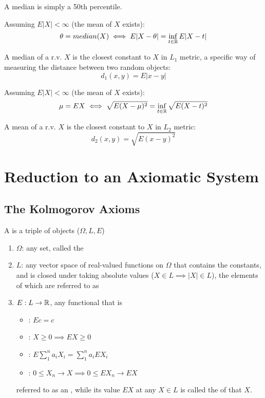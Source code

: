 \documentclass[11pt]{article}
\numberwithin{equation}{section}
\begin{document}
\remark
A median is simply a 50th percentile.

\proposition Assuming $E|X| < \infty$ (the mean of $X$ exists):
\begin{equation}
	\theta = median(X) \iff E|X - \theta| = \inf_{t\in\mathbb{R}} E|X-t|
\end{equation}

\remark
A median of a r.v. $X$ is the closest constant to $X$ in $L_1$ metric, a specific way of measuring the distance between two random objects:
$$d_1(x,y) = E|x - y|$$

\proposition Assuming $E|X| < \infty$ (the mean of $X$ exists):
\begin{equation}
	\mu = EX \iff \sqrt{E(X-\mu)^2} = \inf_{t \in \mathbb{R}} \sqrt{E(X-t)^2}
\end{equation}

\remark
A mean of a r.v. $X$ is the closest constant to $X$ in $L_2$ metric:
$$d_2(x,y) = \sqrt{E(x-y)^2}$$

\section{Reduction to an Axiomatic System}
\subsection{The Kolmogorov Axioms}
A  is a triple of objects ($\Omega, L, E$)
\begin{enumerate}
	\item $\Omega$: any set, called the 
	\item $L$: any vector space of real-valued functions on $\Omega$ that contains the constants, and is closed under taking absolute values ($X \in L \implies |X| \in L$), the elements of which are referred to as 
	\item $E: L \rightarrow \mathbb{R}$, any functional that is 
	\begin{itemize}
		\item {}: $Ec = c$
		\item {}: $X \geq 0 \implies EX \geq 0$
		\item {}: $E\sum_1^na_iX_i = \sum_1^na_iEX_i$
		\item {}: $0\leq X_n \rightarrow X \implies 0 \leq EX_n \rightarrow EX$
	\end{itemize}
	referred to as an , while its value $EX$ at any $X \in L$ is called the  of that $X$.
\end{enumerate} 
\end{document}

